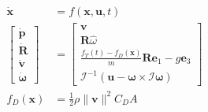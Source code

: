 \documentclass[11pt]{article}
\begin{document}
\begin{align*}
    \dot{\mathbf{x}} &= f(\mathbf{x}, \mathbf{u}, t) \\
    \begin{bmatrix}
        \dot{\mathbf{p}} \\
        \dot{\mathbf{R}} \\
        \dot{\mathbf{v}} \\
        \dot{\mathbf{\omega}}
    \end{bmatrix}
     &= \begin{bmatrix}
        \mathbf{v} \\
        \mathbf{R} \hat{\omega} \\
        \frac{f_T(t) - f_D(\mathbf{x})}{m} \mathbf{R} \mathbf{e}_1 - g\mathbf{e}_3 \\
        \mathcal{I}^{-1} \left( \mathbf{u} - \mathbf{\omega} \times \mathcal{I} \mathbf{\omega} \right)
     \end{bmatrix} \\
     f_D(\mathbf{x}) &= \frac{1}{2} \rho \|\mathbf{v}\|^2 C_D A
\end{align*}
\end{document}

